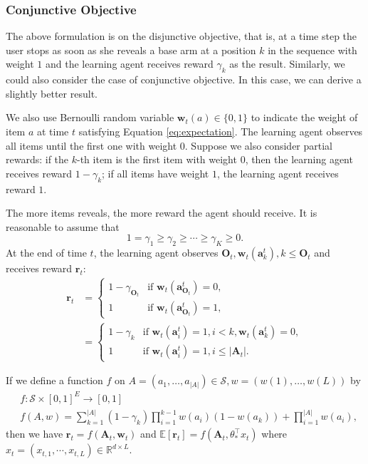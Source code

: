 \documentclass{article}
\newcommand{\EE}{\mathbb{E}}
\newcommand{\RR}{\mathbb{R}}
\newcommand{\bA}{\mathbf{A}}
\newcommand{\ba}{\mathbf{a}}
\newcommand{\bO}{\mathbf{O}}
\newcommand{\br}{\mathbf{r}}
\newcommand{\bw}{\mathbf{w}}
\newcommand{\cS}{\mathcal{S}}
\newcommand{\abs}[1]{\left| #1 \right|}
\begin{document}
\subsubsection{Conjunctive Objective}
\label{sec:conj}

The above formulation is on the disjunctive objective, that is, at a time step the user stops as soon as she reveals a base arm at a position $k$ in the sequence with weight $1$ and the learning agent receives reward $\gamma_k$ as the result. Similarly, we could also consider the case of conjunctive objective. In this case, we can derive a slightly better result.

We also use Bernoulli random variable $\bw_{t}(a) \in \{0,1\}$ to indicate the weight of item $a$ at time $t$ satisfying Equation \eqref{eq:expectation}. The learning agent observes all items until the first one with weight $0$. Suppose we also consider partial rewards: if the $k$-th item is the first item with weight $0$, then the learning agent receives reward $1-\gamma_k$; if all items have weight $1$, the learning agent receives reward $1$. 

The more items reveals, the more reward the agent should receive. It is reasonable to assume that
$$
1 = \gamma_1 \geq \gamma_2 \geq \cdots \geq \gamma_K \geq 0.
$$
At the end of time $t$, the learning agent observes $\bO_{t}, \bw_t(\ba_k^t), k \leq \bO_{t}$ and receives reward $\br_{t}$:
\begin{align*}
	\br_{t} &= \begin{cases}
		1 - \gamma_{\bO_{t}}  &\text{if } \bw_t(\ba_{\bO_{t}}^t) = 0,\\
		1 &\text{if } \bw_t(\ba_{\bO_{t}}^t) = 1,
	\end{cases}\\
	&=\begin{cases}
		1-\gamma_{k}  &\text{if } \bw_t(\ba_{i}^t) = 1, i < k, \bw_t(\ba_{k}^t) = 0,\\
		1 &\text{if } \bw_t(\ba_{i}^t) = 1, i\leq \abs{\bA_t}.
	\end{cases}
\end{align*}

If we define a function $f$ on $A = (a_1, \ldots, a_{\abs{A}}) \in \cS, w = (w(1), \ldots, w(L))$ by
\begin{align}
	&f: \cS \times [0,1]^E \to [0,1] \nonumber \\
	&f(A,w) = \sum_{k = 1}^{\abs{A}} (1 - \gamma_k) \prod_{i = 1}^{k - 1} w(a_i)(1 - w(a_k)) + \prod_{i=1}^{\abs{A}}w(a_i),
\label{eq:AndRewardFunc}
\end{align}
then we have $\br_{t} = f(\bA_t, \bw_t)$ and $\EE[\br_{t}] = f(\bA_t, \theta_{\ast}^{\top}x_t)$ where $x_t = (x_{t,1}, \cdots, x_{t,L}) \in \RR^{d \times L}$. 
\end{document}
